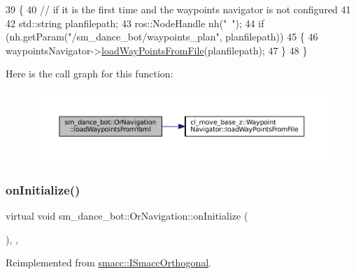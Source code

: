 \begin{DoxyCode}
39     \{
40         \textcolor{comment}{// if it is the first time and the waypoints navigator is not configured}
41 
42         std::string planfilepath;
43         ros::NodeHandle nh(\textcolor{stringliteral}{"~"});
44         \textcolor{keywordflow}{if} (nh.getParam(\textcolor{stringliteral}{"/sm\_dance\_bot/waypoints\_plan"}, planfilepath))
45         \{
46             waypointsNavigator->\hyperlink{classcl__move__base__z_1_1WaypointNavigator_a18d74467ddf0e637a8d5a6e1fa2e93db}{loadWayPointsFromFile}(planfilepath);
47         \}
48     \}
\end{DoxyCode}
Here is the call graph for this function\+:
\nopagebreak
\begin{figure}[H]
\begin{center}
\leavevmode
\includegraphics[width=350pt]{classsm__dance__bot_1_1OrNavigation_a1f092ffe3a1b29ae9ea6623aff00ab16_cgraph}
\end{center}
\end{figure}
\mbox{\label{classsm__dance__bot_1_1OrNavigation_a9f87c78f5af67024c9eda25097a135ac}} 
\subsubsection{\texorpdfstring{on\+Initialize()}{onInitialize()}}
{\footnotesize\ttfamily virtual void sm\+\_\+dance\+\_\+bot\+::\+Or\+Navigation\+::on\+Initialize (\begin{DoxyParamCaption}{ }\end{DoxyParamCaption})\hspace{0.3cm}{\ttfamily [inline]}, {\ttfamily [override]}, {\ttfamily [virtual]}}



Reimplemented from \hyperlink{classsmacc_1_1ISmaccOrthogonal_a6bb31c620cb64dd7b8417f8705c79c7a}{smacc\+::\+I\+Smacc\+Orthogonal}.



